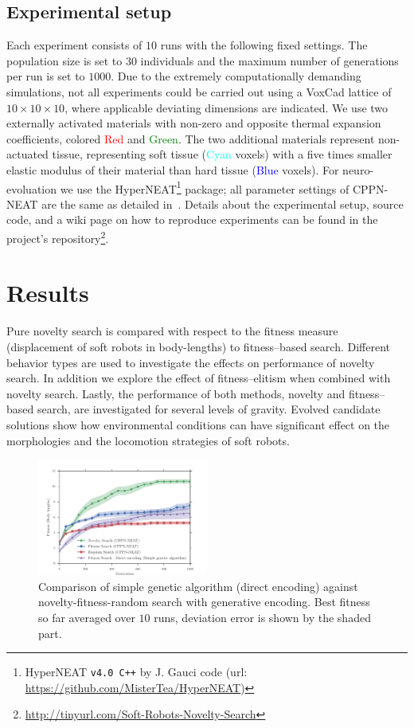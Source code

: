 \documentclass{sig-alternate}
\begin{document}
\subsection{Experimental setup}
Each experiment consists of $10$ runs with the following fixed settings. The population size is set to $30$ individuals and the maximum number of generations per run is set to $1000$. Due to the extremely computationally demanding simulations, not all experiments could be carried out using a VoxCad lattice of $10 \times 10 \times 10$, where applicable deviating dimensions are indicated. We use two externally activated materials with non-zero and opposite thermal expansion coefficients, colored \textcolor{Red}{Red} and \textcolor{Green}{Green}. The two additional materials represent non-actuated tissue, representing soft tissue (\textcolor{Cyan}{Cyan} voxels) with a five times smaller elastic modulus of their material than hard tissue (\textcolor{Blue}{Blue} voxels). %
For neuro-evoluation we use the HyperNEAT\footnote{HyperNEAT \texttt{v4.0 C++}  by J. Gauci code (url: \small{\url{ https://github.com/MisterTea/HyperNEAT})}} package; all parameter settings of CPPN-NEAT are the same as detailed in~\cite{cheney2013unshackling}. Details about the experimental setup, source code, and a wiki page on how to reproduce experiments can be found in  the project's repository\footnote{\small{\url{http://tinyurl.com/Soft-Robots-Novelty-Search}}}.


\section{Results}
Pure novelty search is compared with respect to the fitness measure (displacement of soft robots in body-lengths) to fitness--based search. Different behavior types are used to investigate the effects on performance of novelty search. In addition we explore the effect of fitness--elitism when combined with novelty search. Lastly, the performance of both methods, novelty and fitness--based search, are investigated for several levels of gravity. Evolved candidate solutions show how environmental conditions can have significant effect on the morphologies and the locomotion strategies of soft robots.


\begin{figure}[t!]
\centering
\includegraphics[width=0.5\textwidth]{../Figures/Results/FitNovRandomDirectSize5.pdf}
\caption{Comparison of simple genetic algorithm (direct encoding) against novelty-fitness-random search with generative encoding. Best fitness so far averaged over $10$ runs, deviation error is shown by the shaded part.}
\label{fig:FitNovRandomDirectSize5}
\end{figure}
\end{document}
